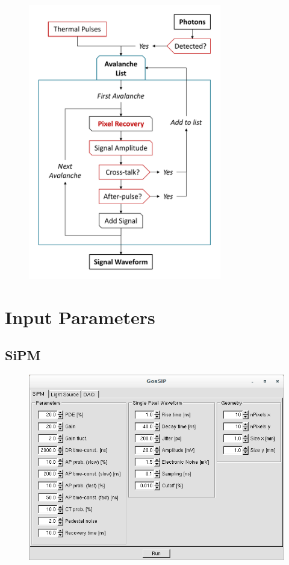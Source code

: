 \begin{figure}[h]
	\centering
	\includegraphics[width=0.75\textwidth]{SimulationFlow}
\end{figure}



\chapter{Input Parameters}
\section{SiPM}

\begin{figure}[h!]
	\includegraphics[height=0.25\textheight]{GUI1.png}
\end{figure}

